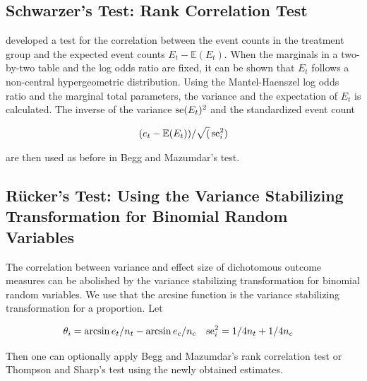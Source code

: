 \documentclass[11pt,a4paper,twoside]{book}\usepackage[]{graphicx}\usepackage[]{color}
\begin{document}
\subsection{Schwarzer's Test: Rank Correlation Test} \label{sec:Schwarzer}
\citealp{Schwarzer} developed a test for the correlation between the event counts in the treatment group and the expected event counts $E_t - \mathbb{E}(E_t)$. When the marginals in a two-by-two table and the log odds ratio are fixed, it can be shown that $E_t$ follows a non-central hypergeometric distribution. Using the Mantel-Haenszel log odds ratio and the marginal total parameters, the variance and the expectation of $E_t$ is calculated. The inverse of the variance $\operatorname{se}(E_t)^2$ and the standardized event count

\begin{align}
(e_t - \mathbb{E}(E_t))/\sqrt(\operatorname{se}_i^2)
\end{align}

are then used as before in Begg and Mazumdar's test.

\subsection{R\"ucker's Test: Using the Variance Stabilizing Transformation for Binomial Random Variables} \label{sec:Rucker}
The correlation between variance and effect size of dichotomous outcome measures can be abolished by the variance stabilizing transformation for binomial random variables. We use that the arcsine function is the variance stabilizing transformation for a proportion. Let

\begin{align}
\theta_i &= \arcsin{e_t/n_t} - \arcsin{e_c/n_c} \nonumber &
\operatorname{se}_i^2 &= 1/4n_t + 1/4n_c \nonumber
\end{align}

Then one can optionally apply Begg and Mazumdar's rank correlation test or Thompson and Sharp's test using the newly obtained estimates.
\end{document}
